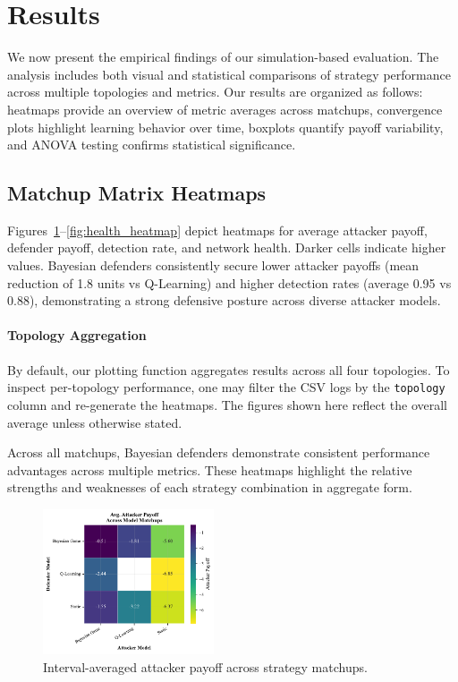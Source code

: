 \documentclass[conference]{IEEEtran}
\begin{document}
\section{Results}

We now present the empirical findings of our simulation-based evaluation. The analysis includes both visual and statistical comparisons of strategy performance across multiple topologies and metrics. Our results are organized as follows: heatmaps provide an overview of metric averages across matchups, convergence plots highlight learning behavior over time, boxplots quantify payoff variability, and ANOVA testing confirms statistical significance.

\subsection{Matchup Matrix Heatmaps}
Figures~\ref{fig:atk_payoff_heatmap}--\ref{fig:health_heatmap} depict heatmaps for average attacker payoff, defender payoff, detection rate, and network health. Darker cells indicate higher values. Bayesian defenders consistently secure lower attacker payoffs (mean reduction of 1.8 units vs Q-Learning) and higher detection rates (average 0.95 vs 0.88), demonstrating a strong defensive posture across diverse attacker models.

\paragraph{Topology Aggregation}  
By default, our plotting function aggregates results across all four topologies. To inspect per-topology performance, one may filter the CSV logs by the \texttt{topology} column and re-generate the heatmaps. The figures shown here reflect the overall average unless otherwise stated.

Across all matchups, Bayesian defenders demonstrate consistent performance advantages across multiple metrics. These heatmaps highlight the relative strengths and weaknesses of each strategy combination in aggregate form.

\begin{figure}[htbp]
  \centering
  \includegraphics[width=0.45\textwidth]{fig_atk_payoff_heatmap.pdf}
  \caption{Interval-averaged attacker payoff across strategy matchups.}
  \label{fig:atk_payoff_heatmap}
\end{figure}
\end{document}

